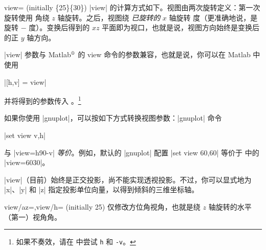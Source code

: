 {\begin{pgfplotskey}{view= (initially \{25\}\{30\})}
    |view| 的计算方式如下。视图由两次旋转定义：第一次旋转使用  角绕 $z$ 轴旋转。之后，视图绕 \emph{已旋转的} $x$ 轴旋转  度（更准确地说，是旋转 $-$ 度）。变换后得到的 $xz$ 平面即为视口，也就是说，视图方向始终是变换后的正 $y$ 轴方向。

    |view| 参数与 Matlab$^\text{\textregistered}$ 的 view 命令的参数兼容，也就是说，你可以在 Matlab 中使用

    |[h,v] = view|

    \noindent 并将得到的参数传入 \PGFPlots{}。\footnote{如果不奏效，请在 \PGFPlots{} 中尝试 \texttt{h} 和 \texttt{-v}。}

    如果你使用 |gnuplot|，可以按如下方式转换视图参数：|gnuplot| 命令

    |set view v,h|

    \noindent 与 |view={h}{90-v}| \emph{等价}。例如，默认的 |gnuplot| 配置 |set view 60,60| 等价于 \PGFPlots{} 中的 |view={60}{30}|。

    |view|（目前）始终是正交投影，尚不能实现透视投影。不过，你可以显式地为 |x|、|y| 和 |z| 指定投影单位向量，以得到倾斜的三维坐标轴。
\end{pgfplotskey}

\begin{pgfplotskeylist}{view/az=,view/h= (initially 25)}
    仅修改方位角视角，也就是绕 $z$ 轴旋转的水平（第一）视角角。
\pgfplotsexpensiveexample
\begin{codeexample}[]
\end{codeexample}

\pgfplotsexpensiveexample
\begin{codeexample}[]
\end{codeexample}


\end{pgfplotskeylist}}
